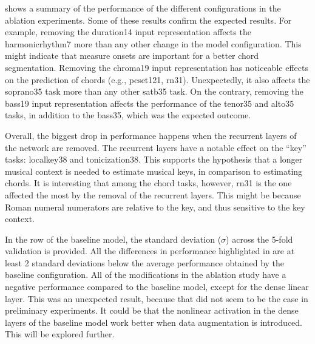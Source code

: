 

 shows a summary of the performance of the
different configurations in the ablation experiments. Some
of these results confirm the expected results. For example,
removing the \gls{duration14} input representation affects
the \gls{harmonicrhythm7} more than any other change in the
model configuration. This might indicate that measure onsets
are important for a better chord segmentation. Removing the
\gls{chroma19} input representation has noticeable effects
on the prediction of chords (e.g., \gls{pcset121},
\gls{rn31}). Unexpectedly, it also affects the
\gls{soprano35} task more than any other \gls{satb35} task.
On the contrary, removing the \gls{bass19} input
representation affects the performance of the \gls{tenor35}
and \gls{alto35} tasks, in addition to the \gls{bass35},
which was the expected outcome.

Overall, the biggest drop in performance happens when the
recurrent layers of the network are removed. The recurrent
layers have a notable effect on the ``key'' tasks:
\gls{localkey38} and \gls{tonicization38}. This supports the
hypothesis that a longer musical context is needed to
estimate musical keys, in comparison to estimating chords.
It is interesting that among the chord tasks, however,
\gls{rn31} is the one affected the most by the removal of
the recurrent layers. This might be because Roman numeral
numerators are relative to the key, and thus sensitive to
the key context.

In the row of the baseline model, the standard deviation
($\sigma$) across the 5-fold validation is provided. All the
differences in performance highlighted in 
are at least 2 standard deviations below the average
performance obtained by the baseline configuration. All of
the modifications in the ablation study have a negative
performance compared to the baseline model, except for the
dense linear layer. This was an unexpected result, because
that did not seem to be the case in preliminary experiments.
It could be that the nonlinear activation in the dense
layers of the baseline model work better when data
augmentation is introduced. This will be explored further.
